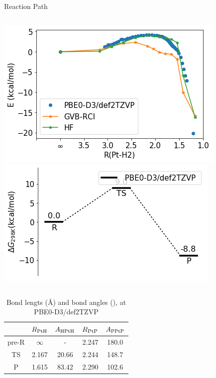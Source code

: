 \documentclass[10pt,aspectratio=43,mathserif]{beamer}
\begin{document}
\begin{frame}
Reaction Path
\begin{columns}
	\includegraphics[width=\linewidth]{../Pt/pbe0/irc/irc.png}
    \includegraphics[width=\linewidth]{../Pt/pbe0/Pt.png}
\end{columns}
\begin{table}
	\centering
	\begin{tabular}{ccccc}
		\hline
		& $ R_{\ce{PtH}} $ & $ A_{\ce{HPtH}} $ & $ R_{\ce{PtP}} $ &$ A_{\ce{PPtP}} $\\ \hline
		pre-R & $ \infty $ & - & 2.247 & 180.0 \\
		TS & 2.167 & 20.66 & 2.244 & 148.7 \\
		P & 1.615 & 83.42 & 2.290 & 102.6\\
		\hline
	\end{tabular}
	\caption{Bond lengts (\AA) and bond angles (\textdegree), at PBE0-D3/def2TZVP}
\end{table}


\end{frame}
\end{document}
